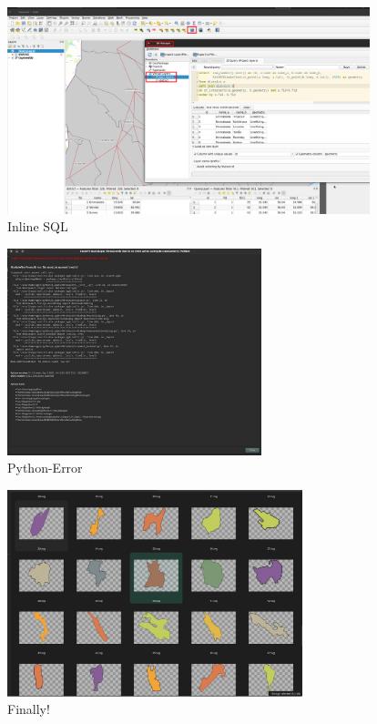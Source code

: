 \begin{frame}
    \begin{figure}
        \centering
        \includegraphics[height = 6cm]{images/qgis_sql.png}%
        \caption{Inline SQL}
    \end{figure}
\end{frame}

\begin{frame}
    \begin{figure}
        \centering
        \includegraphics[height = 6cm]{images/qgis_pythonerror.jpg}%
        \caption{Python-Error}
    \end{figure}
\end{frame}

\begin{frame}
    \begin{figure}
        \centering
        \includegraphics[height = 6cm]{images/svg_finished.jpg}%
        \caption{Finally!}
    \end{figure}
\end{frame}

